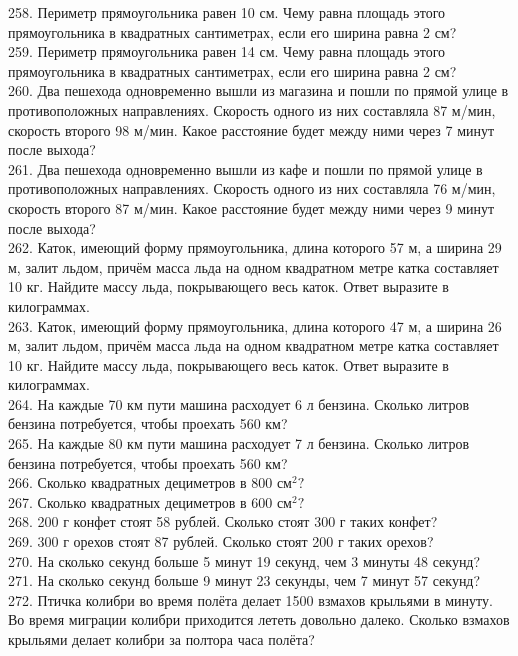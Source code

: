 258. Периметр прямоугольника равен 10 см. Чему равна площадь этого прямоугольника в квадратных сантиметрах, если его ширина равна 2 см?\\
259. Периметр прямоугольника равен 14 см. Чему равна площадь этого прямоугольника в квадратных сантиметрах, если его ширина равна 2 см?\\
260. Два пешехода одновременно вышли из магазина и пошли по прямой улице в противоположных направлениях. Скорость одного из них составляла 87 м/мин, скорость второго 98 м/мин. Какое расстояние будет между ними через 7 минут после выхода?\\
261. Два пешехода одновременно вышли из кафе и пошли по прямой улице в противоположных направлениях. Скорость одного из них составляла 76 м/мин, скорость второго 87 м/мин. Какое расстояние будет между ними через 9 минут после выхода?\\
262. Каток, имеющий форму прямоугольника, длина которого 57 м, а ширина 29 м, залит льдом, причём масса льда на одном квадратном метре катка составляет 10 кг. Найдите массу льда, покрывающего весь каток. Ответ выразите в килограммах.\\
263. Каток, имеющий форму прямоугольника, длина которого 47 м, а ширина 26 м, залит льдом, причём масса льда на одном квадратном метре катка составляет 10 кг. Найдите массу льда, покрывающего весь каток. Ответ выразите в килограммах.\\
264. На каждые 70 км пути машина расходует 6 л бензина. Сколько литров бензина потребуется, чтобы проехать 560 км?\\
265. На каждые 80 км пути машина расходует 7 л бензина. Сколько литров бензина потребуется, чтобы проехать 560 км?\\
266. Сколько квадратных дециметров в $800\text{ см}^2?$\\
267. Сколько квадратных дециметров в $600\text{ см}^2?$\\
268. 200 г конфет стоят 58 рублей. Сколько стоят 300 г таких конфет?\\
269. 300 г орехов стоят 87 рублей. Сколько стоят 200 г таких орехов?\\
270. На сколько секунд больше 5 минут 19 секунд, чем 3 минуты 48 секунд?\\
271. На сколько секунд больше 9 минут 23 секунды, чем 7 минут 57 секунд?\\
272. Птичка колибри во время полёта делает 1500 взмахов крыльями в минуту. Во время миграции колибри приходится лететь довольно далеко. Сколько взмахов крыльями делает колибри за полтора часа полёта?\\
